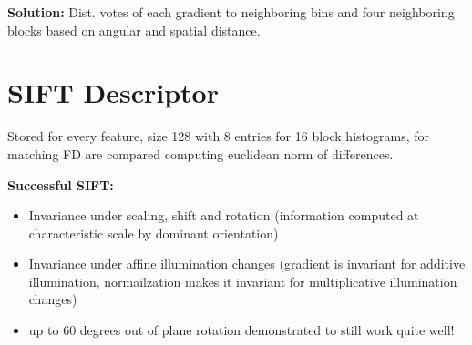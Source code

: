 \textbf{Solution:} Dist. votes of each gradient to neighboring bins and four neighboring blocks based on angular and spatial distance.

\section{SIFT Descriptor}

Stored for every feature, size 128 with 8 entries for 16 block histograms, for matching FD are compared computing euclidean norm of differences.

\textbf{Successful SIFT:}

\begin{itemize}
    \item Invariance under scaling, shift and rotation (information computed at characteristic scale by dominant orientation)
    \item Invariance under affine illumination changes (gradient is invariant for additive illumination, normailzation makes it invariant for multiplicative illumination changes)
    \item up to 60 degrees out of plane rotation demonstrated to still work quite well!
\end{itemize}

















